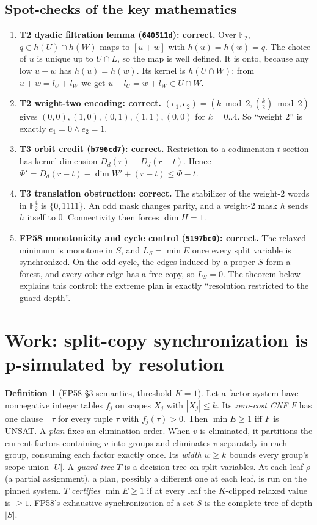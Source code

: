 \documentclass[11pt]{article}
\theoremstyle{definition}
\newtheorem{definition}{Definition}
\theoremstyle{remark}
\begin{document}
\subsection{Spot-checks of the key mathematics}\label{sec:spot}
\begin{enumerate}
\item \textbf{T2 dyadic filtration lemma (\texttt{640511d}): correct.} Over $\mathbb F_2$,
$q\in h(U)\cap h(W)$ maps to $[u+w]$ with $h(u)=h(w)=q$. The choice of $u$ is unique up to
$U\cap L$, so the map is well defined. It is onto, because any low $u+w$ has $h(u)=h(w)$. Its
kernel is $h(U\cap W)$: from $u+w=l_U+l_W$ we get $u+l_U=w+l_W\in U\cap W$.
\item \textbf{T2 weight-two encoding: correct.} $(e_1,e_2)=(k\bmod2,\binom k2\bmod2)$
gives $(0,0),(1,0),(0,1),(1,1),(0,0)$ for $k=0..4$. So ``weight $2$'' is exactly
$e_1=0\wedge e_2=1$.
\item \textbf{T3 orbit credit (\texttt{b796cd7}): correct.} Restriction to a codimension-$t$
section has kernel dimension $D_d(r)-D_d(r-t)$. Hence
$\Phi'=D_d(r-t)-\dim W'+(r-t)\le\Phi-t$.
\item \textbf{T3 translation obstruction: correct.} The stabilizer of the weight-2 words in
$\mathbb F_2^4$ is $\{0,1111\}$. An odd mask changes parity, and a weight-2 mask $h$ sends $h$
itself to $0$. Connectivity then forces $\dim H=1$.
\item \textbf{FP58 monotonicity and cycle control (\texttt{5197bc0}): correct.} The relaxed
minimum is monotone in $S$, and $L_S=\min E$ once every split variable is synchronized. On the
odd cycle, the edges induced by a proper $S$ form a forest, and every other edge has a free
copy, so $L_S=0$. The theorem below explains this control: the extreme plan is exactly
``resolution restricted to the guard depth''.
\end{enumerate}

\section{Work: split-copy synchronization is p-simulated by resolution}\label{sec:work}
\begin{definition}[FP58 \S3 semantics, threshold $K=1$]
Let a factor system have nonnegative integer tables $f_j$ on scopes $X_j$ with $|X_j|\le k$.
Its \emph{zero-cost CNF} $F$ has one clause $\neg\tau$ for every tuple $\tau$ with
$f_j(\tau)>0$. Then $\min E\ge1$ iff $F$ is UNSAT. A \emph{plan} fixes an elimination order.
When $v$ is eliminated, it partitions the current factors containing $v$ into groups and
eliminates $v$ separately in each group, consuming each factor exactly once. Its \emph{width}
$w\ge k$ bounds every group's scope union $|U|$. A \emph{guard tree} $T$ is a decision tree on
split variables. At each leaf $\rho$ (a partial assignment), a plan, possibly a different one
at each leaf, is run on the pinned system. $T$ \emph{certifies} $\min E\ge1$ if at every leaf
the $K$-clipped relaxed value is $\ge1$. FP58's exhaustive synchronization of a set $S$ is the
complete tree of depth $|S|$.
\end{definition}
\end{document}
